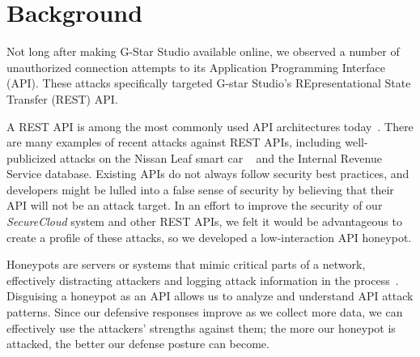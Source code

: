 
\section{Background} \label{background}

Not long after making G-Star Studio available online, we observed a number of unauthorized connection attempts to its Application Programming Interface (API).  
These attacks specifically targeted G-star Studio's REpresentational State Transfer (REST) API.

A REST API is among the most commonly used API architectures today~\cite{REST-API-use}.
There are many examples of recent attacks against REST APIs, including well-publicized attacks on the Nissan Leaf smart car
~\cite{Nissan-Leaf} 
and the Internal Revenue Service database.
Existing APIs do not always follow security best practices, and developers might be lulled into a false sense of security by believing that their API will not be an attack target.  
In an effort to improve the security of our {\em SecureCloud} system and other REST APIs, we felt it would be advantageous to create a profile of these attacks, so we developed a low-interaction API honeypot.


Honeypots are servers or systems that mimic critical parts of a network, effectively distracting attackers and logging attack information in the process~\cite{honeypot-Def}.
Disguising a honeypot as an API allows us to analyze and understand API attack patterns.
Since our defensive responses improve as we collect more data, we can effectively use the attackers' strengths against them; the more our honeypot is attacked, the better our defense posture can become.

